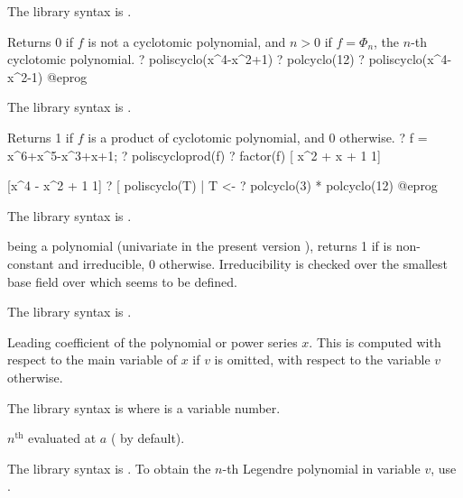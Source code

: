 The library syntax is .

\label{se:poliscyclo}
Returns 0 if $f$ is not a cyclotomic polynomial, and $n > 0$ if $f =
\Phi_n$, the $n$-th cyclotomic polynomial.
\bprog
? poliscyclo(x^4-x^2+1)
? polcyclo(12)
? poliscyclo(x^4-x^2-1)
@eprog

The library syntax is .

\label{se:poliscycloprod}
Returns 1 if $f$ is a product of cyclotomic polynomial, and $0$
otherwise.
\bprog
? f = x^6+x^5-x^3+x+1;
? poliscycloprod(f)
? factor(f)
[  x^2 + x + 1 1]

[x^4 - x^2 + 1 1]
? [ poliscyclo(T) | T <- %
? polcyclo(3) * polcyclo(12)
@eprog

The library syntax is .

\label{se:polisirreducible}
 being a polynomial (univariate in the present version \vers),
returns 1 if  is non-constant and irreducible, 0 otherwise.
Irreducibility is checked over the smallest base field over which 
seems to be defined.

The library syntax is .

\label{se:pollead}
Leading coefficient of the polynomial or power series $x$. This is
 computed with respect to the main variable of $x$ if $v$ is omitted, with
 respect to the variable $v$ otherwise.

The library syntax is  where  is a variable number.

\label{se:pollegendre}
$n^{\text{th}}$  evaluated at $a$ ( by
default).

The library syntax is .
To obtain the $n$-th Legendre polynomial in variable $v$,
use .

